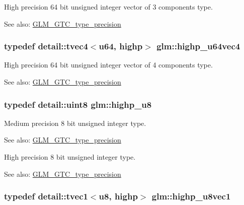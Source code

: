 High precision 64 bit unsigned integer vector of 3 components type. \begin{Desc}
\item[See also:]\hyperlink{group__gtc__type__precision}{GLM\_\-GTC\_\-type\_\-precision} \end{Desc}
\hypertarget{group__gtc__type__precision_g8aa6fc9f16dfa3078d411f6361188a45}{
\subsubsection[highp\_\-u64vec4]{\setlength{\rightskip}{0pt plus 5cm}typedef detail::tvec4$<$u64, highp$>$ {\bf glm::highp\_\-u64vec4}}}
\label{group__gtc__type__precision_g8aa6fc9f16dfa3078d411f6361188a45}


High precision 64 bit unsigned integer vector of 4 components type. \begin{Desc}
\item[See also:]\hyperlink{group__gtc__type__precision}{GLM\_\-GTC\_\-type\_\-precision} \end{Desc}
\hypertarget{group__gtc__type__precision_g8a60abe782749c504fb5ae51eb8b49cc}{
\subsubsection[highp\_\-u8]{\setlength{\rightskip}{0pt plus 5cm}typedef detail::uint8 {\bf glm::highp\_\-u8}}}
\label{group__gtc__type__precision_g8a60abe782749c504fb5ae51eb8b49cc}


Medium precision 8 bit unsigned integer type. \begin{Desc}
\item[See also:]\hyperlink{group__gtc__type__precision}{GLM\_\-GTC\_\-type\_\-precision}\end{Desc}
High precision 8 bit unsigned integer type. \begin{Desc}
\item[See also:]\hyperlink{group__gtc__type__precision}{GLM\_\-GTC\_\-type\_\-precision} \end{Desc}
\hypertarget{group__gtc__type__precision_g8e7e9156357a2b748fe39702c3bdbeec}{
\subsubsection[highp\_\-u8vec1]{\setlength{\rightskip}{0pt plus 5cm}typedef detail::tvec1$<$u8, highp$>$ {\bf glm::highp\_\-u8vec1}}}
\label{group__gtc__type__precision_g8e7e9156357a2b748fe39702c3bdbeec}


